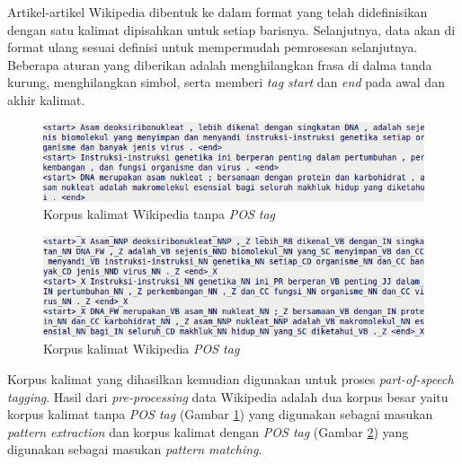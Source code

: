 Artikel-artikel Wikipedia dibentuk ke dalam format yang telah didefinisikan dengan satu kalimat dipisahkan untuk setiap barisnya. Selanjutnya, data akan di format ulang sesuai definisi untuk mempermudah pemrosesan selanjutnya. Beberapa aturan yang diberikan adalah menghilangkan frasa di dalma tanda kurung, menghilangkan simbol, serta memberi \textit{tag start} dan \textit{end} pada awal dan akhir kalimat.

\begin{figure}
    \centering
    \includegraphics[width=\linewidth]{pics/kalimatWiki}
    \caption{Korpus kalimat Wikipedia tanpa \textit{POS tag}}
    \label{fig:kalimat-wiki}
\end{figure}

\begin{figure}
    \centering
    \includegraphics[width=\linewidth]{pics/kalimatWikiTag}
    \caption{Korpus kalimat Wikipedia \textit{POS tag}}
    \label{fig:kalimat-wiki-tag}
\end{figure}

\noindent Korpus kalimat yang dihasilkan kemudian digunakan untuk proses \textit{part-of-speech tagging}. Hasil dari \textit{pre-processing} data Wikipedia adalah dua korpus besar yaitu korpus kalimat tanpa \textit{POS tag} (Gambar \ref{fig:kalimat-wiki}) yang digunakan sebagai masukan \textit{pattern extraction} dan korpus kalimat dengan \textit{POS tag} (Gambar \ref{fig:kalimat-wiki-tag}) yang digunakan sebagai masukan \textit{pattern matching}. 

